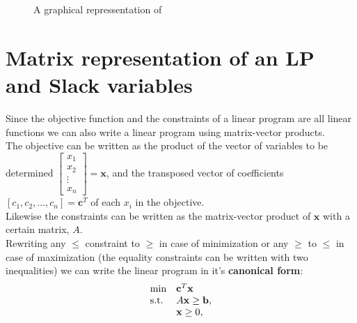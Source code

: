 \begin{figure}[H]
\caption{A graphical repressentation of }
\end{figure}
\section{Matrix representation of an LP and Slack variables}
Since the objective function and the constraints of a linear program are all linear functions we can also write a linear program using matrix-vector products. \\
The objective can be written as the product of the vector of variables to be determined 
$\begin{bmatrix}x_{1} \\ x_{2} \\
\vdots \\
x_{n}
\end{bmatrix}=\textbf{x}$, and the transposed vector of coefficients $[c_1,c_2,...,c_n]=\textbf{c}^T$ of each $x_i$ in the objective.\\
Likewise the constraints can be written as the matrix-vector product of $\textbf{x}$ with a certain matrix, $A$.\\
Rewriting any $\leq$ constraint to $\geq$ in case of minimization or any $\geq$ to $\leq$ in case of maximization (the equality constraints can be written with two inequalities) we can write the linear program in it's \textbf{canonical form}:
\begin{align}\label{canonicalMin}
\begin{array}{ll@{}ll}
\text{min} &\textbf{c}^T\textbf{x}&\\
\text{s.t.} &A\textbf{x} \geq \textbf{b},&\\
&\textbf{x} \geq 0,&\\
\end{array}
\end{align}
